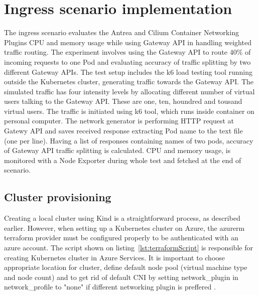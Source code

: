 \section{Ingress scenario implementation}
\label{sec:ingressImpl}

The ingress scenario evaluates the Antrea and Cilium Container Networking Plugins CPU and memory usage while using Gateway API in handling weighted traffic routing. The experiment involves using the Gateway API to route 40\% of incoming requests to one Pod and evaluating accuracy of traffic splitting by two different Gateway APIs. The test setup includes the k6 load testing tool running outside the Kubernetes cluster, generating traffic towards the Gateway API. The simulated traffic has four intensity levels by allocating different number of virtual users talking to the Gateway API. These are one, ten, houndred and tousand virtual users. The traffic is initiated using k6 tool, which runs inside container on personal computer. The network generator is performing HTTP request at Gatewy API and saves received response extracting Pod name to the text file (one per line). Having a list of responses containing names of two pods, accuracy of Gateway API traffic splitting is calculated. CPU and memory usage, is monitored with a Node Exporter during whole test and fetched at the end of scenario.


\subsection{Cluster provisioning}
\label{sec:clusterProvisioning}

Creating a local cluster using Kind is a straightforward process, as described earlier. However, when setting up a Kubernetes cluster on Azure, the azurerm terraform provider must be configured properly to be authenticated with an azure account. The script shown on listing~\ref{lst:terraformScript} is responsible for creating Kubernetes cluster in Azure Services. It is important to choose appropriate location for cluster, define default node pool (virtual machine type and node count) and to get rid of default CNI by setting network\_plugin in network\_profile to "none" if different networking plugin is preffered \cite{AKS}.

